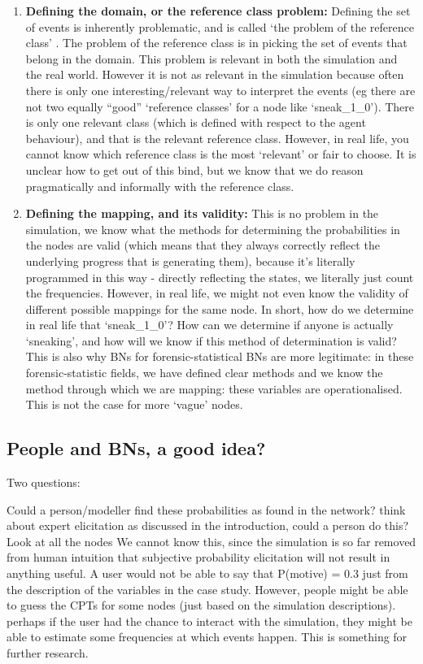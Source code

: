 \documentclass[11pt]{article}
\begin{document}
\begin{enumerate}
\begin{enumerate}
\item \textbf{Defining the domain, or the reference class problem:} Defining the set of events is inherently problematic, and is called `the problem of the reference class' \citep{colyvan2001}. The problem of the reference class is in picking the set of events that belong in the domain. This problem is relevant in both the simulation and the real world.  However it is not as relevant in the simulation because often there is only one interesting/relevant way to interpret the events (eg there are not two equally ``good'' `reference classes' for a node like `sneak\_1\_0'). There is only one relevant class (which is defined with respect to the agent behaviour), and that is the relevant reference class. However, in real life, you cannot know which reference class is the most `relevant' or fair to choose. It is unclear how to get out of this bind, but we know that we do reason pragmatically and informally with the reference class.
\item \textbf{Defining the mapping, and its validity:} This is no problem in the simulation, we know what the methods for determining the probabilities in the nodes are valid (which means that they always correctly reflect the underlying progress that is generating them), because it's literally programmed in this way - directly reflecting the states, we literally just count the frequencies. However, in real life, we might not even know the validity of different possible mappings for the same node. In short, how do we determine in real life that `sneak\_1\_0'? How can we determine if anyone is actually `sneaking', and how will we know if this method of determination is valid? This is also why BNs for forensic-statistical BNs are more legitimate: in these forensic-statistic fields, we have defined clear methods and we know the method through which we are mapping: these variables are operationalised. This is not the case for more `vague' nodes.
\end{enumerate}
\end{enumerate}


\subsection{People and BNs, a good idea?}
Two questions:

Could a person/modeller find these probabilities as found in the network?
think about expert elicitation as discussed in the introduction, could a person do this?
Look at all the nodes
We cannot know this, since the simulation is so far removed from human intuition that subjective probability elicitation will not result in anything useful. A user would not be able to say that P(motive) = 0.3 just from the description of the variables in the case study. However, people might be able to guess the CPTs for some nodes (just based on the simulation descriptions). perhaps if the user had the chance to interact with the simulation, they might be able to estimate some frequencies at which events happen. This is something for further research. 
\end{document}
